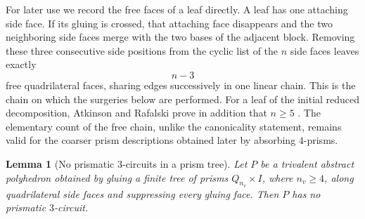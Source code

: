 \documentclass[12pt,a4paper]{article}
\newtheorem{lemma}[theorem]{Lemma}
\theoremstyle{definition}
\begin{document}
For later use we record the free faces of a leaf directly. A leaf has one
attaching side face.  If its gluing is crossed, that attaching face disappears
and the two neighboring side faces merge with the two bases of the adjacent
block.  Removing these three consecutive side positions from the cyclic list
of the \(n\) side faces leaves exactly
\begin{equation}\label{eq:leaf-free-chain}
        n-3
\end{equation}
free quadrilateral faces, sharing edges successively in one linear chain.  This
is the chain on which the surgeries below are performed.  For a leaf of the
initial reduced decomposition, Atkinson and Rafalski prove in addition that
\(n\ge5\) \cite[Lemma~3.5]{AtkinsonRafalski}.  The elementary count of the
free chain, unlike the canonicality statement, remains valid for the coarser
prism descriptions obtained later by absorbing \(4\)-prisms.

\begin{lemma}[No prismatic \(3\)-circuits in a prism tree]
\label{lem:prism-tree-no-three}
Let \(P\) be a trivalent abstract polyhedron obtained by gluing a finite tree
of prisms \(Q_{n_v}\times I\), where \(n_v\ge4\), along quadrilateral side
faces and suppressing every gluing face.  Then \(P\) has no prismatic
\(3\)-circuit.
\end{lemma}
\end{document}
